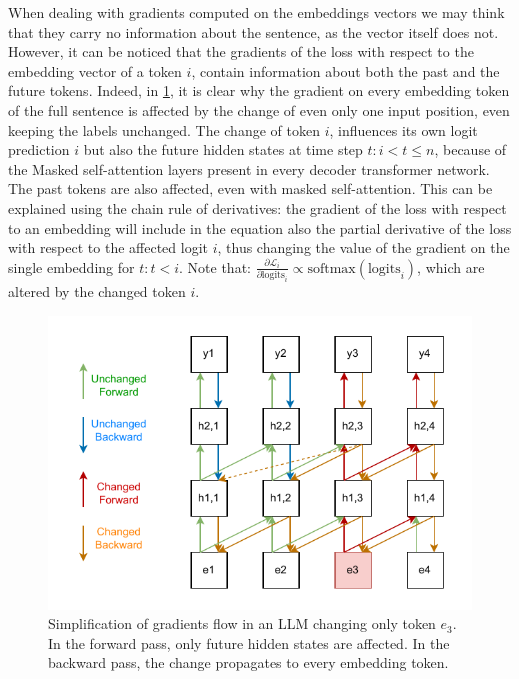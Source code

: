 \documentclass[../thesis.tex]{subfiles}
\begin{document}
When dealing with gradients computed on the embeddings vectors we may think that they carry no information about the sentence, as the vector itself does not. However, it can be noticed that the gradients of the loss with respect to the embedding vector of a token $i$, contain information about both the past and the future tokens.
Indeed, in \cref{fig:llm_gradients_changing_embedding}, it is clear why the gradient on every embedding token of the full sentence is affected by the change of even only one input position, even keeping the labels unchanged.
The change of token $i$, influences its own logit prediction $i$ but also the future hidden states at time step $t: i < t \leq n$, because of the Masked self-attention layers present in every decoder transformer network.
The past tokens are also affected, even with masked self-attention. This can be explained using the chain rule of derivatives: the gradient of the loss with respect to an embedding will include in the equation also the partial derivative of the loss with respect to the affected logit $i$, thus changing the value of the gradient on the single embedding for $t: t < i$.
Note that: $\frac{\partial\mathcal{L}_i}{\partial{\text{logits}_i}} \propto \text{softmax}(\text{logits}_i)$, which are altered by the changed token $i$.

\begin{figure}
    \centering
    \includegraphics[width=0.7\linewidth]{assets/pag/llm/llm_gradients_changing_embedding.drawio.pdf}
    \caption{Simplification of gradients flow in an LLM changing only token $e_3$. In the forward pass, only future hidden states are affected. In the backward pass, the change propagates to every embedding token.}
    \label{fig:llm_gradients_changing_embedding}
\end{figure}

\subbib{}
\end{document}
